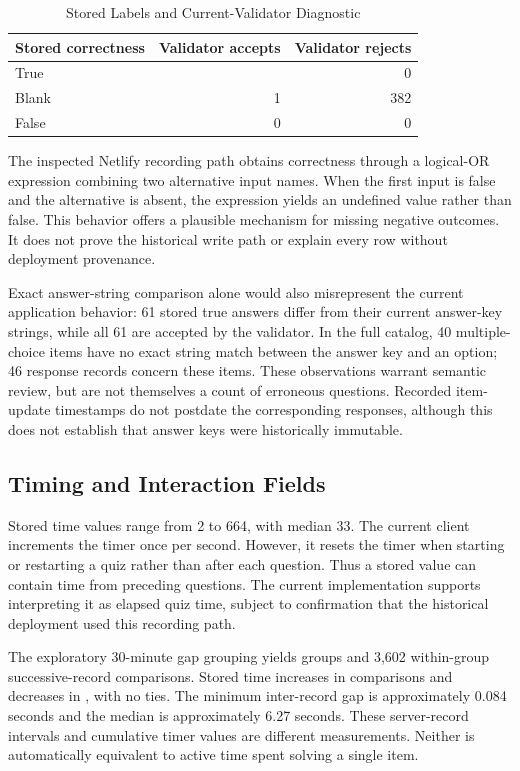 \documentclass[conference]{IEEEtran}
\begin{document}
\begin{table}[t]
\caption{Stored Labels and Current-Validator Diagnostic}
\label{tab:labels}
\centering
\begin{tabular}{lrr}
\hline
Stored correctness & Validator accepts & Validator rejects \\
\hline
True & \TrueCount{} & 0 \\
Blank & 1 & 382 \\
False & 0 & 0 \\
\hline
\end{tabular}
\end{table}

The inspected Netlify recording path obtains correctness through a logical-OR expression combining two alternative input names. When the first input is false and the alternative is absent, the expression yields an undefined value rather than false. This behavior offers a plausible mechanism for missing negative outcomes. It does not prove the historical write path or explain every row without deployment provenance.

Exact answer-string comparison alone would also misrepresent the current application behavior: 61 stored true answers differ from their current answer-key strings, while all 61 are accepted by the validator. In the full catalog, 40 multiple-choice items have no exact string match between the answer key and an option; 46 response records concern these items. These observations warrant semantic review, but are not themselves a count of erroneous questions. Recorded item-update timestamps do not postdate the corresponding responses, although this does not establish that answer keys were historically immutable.

\subsection{Timing and Interaction Fields}
Stored time values range from 2 to 664, with median 33. The current client increments the timer once per second. However, it resets the timer when starting or restarting a quiz rather than after each question. Thus a stored value can contain time from preceding questions. The current implementation supports interpreting it as elapsed quiz time, subject to confirmation that the historical deployment used this recording path.

The exploratory 30-minute gap grouping yields \DescriptiveSessionCount{} groups and 3,602 within-group successive-record comparisons. Stored time increases in \TimerIncreaseCount{} comparisons and decreases in \TimerDecreaseCount{}, with no ties. The minimum inter-record gap is approximately 0.084 seconds and the median is approximately 6.27 seconds. These server-record intervals and cumulative timer values are different measurements. Neither is automatically equivalent to active time spent solving a single item.
\end{document}

